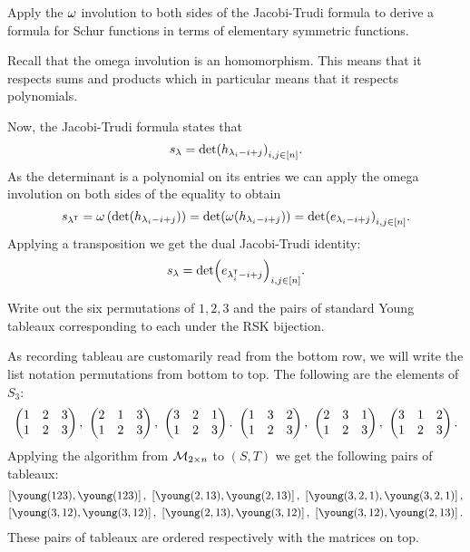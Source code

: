 \documentclass[12pt]{memoir}
\begin{document}
\begin{Ej}[Exercise 2]
    Apply the $\omega$ involution to both sides of the Jacobi-Trudi formula to derive a formula
for Schur functions in terms of elementary symmetric functions.
\end{Ej}

\begin{ptcbr}
    Recall that the omega involution is an homomorphism. This means that it respects sums and products which in particular means that it respects polynomials.\par 
    Now, the Jacobi-Trudi formula states that 
    $$s_\lambda=\det(h_{\lambda_i-i+j})_{i,j\in[n]}.$$
    As the determinant is a polynomial on its entries we can apply the omega involution on both sides of the equality to obtain 
    $$s_{\lambda^{\mathsf{T}}}=\omega\left(\det(h_{\lambda_i-i+j})\right)=\det(\omega(h_{\lambda_i-i+j}))=\det(e_{\lambda_i-i+j})_{i,j\in[n]}.$$
    Applying a transposition we get the dual Jacobi-Trudi identity:
    $$s_{\lambda}=\det(e_{\lambda^{\mathsf{T}}_i-i+j})_{i,j\in[n]}.$$
\end{ptcbr}

\begin{Ej}[Exercise 3]
    Write out the six permutations of $1, 2, 3$ and the pairs of standard Young tableaux corresponding to each under the RSK bijection.
\end{Ej}

\begin{ptcbr}
    As recording tableau are customarily read from the bottom row, we will write the list notation permutations from bottom to top. The following are the elements of $S_3$:
    \begin{gather*}
        \twobythree{1}{2}{3}{1}{2}{3},\ \twobythree{2}{1}{3}{1}{2}{3},\ \twobythree{3}{2}{1}{1}{2}{3}.\ \twobythree{1}{3}{2}{1}{2}{3},\ \twobythree{2}{3}{1}{1}{2}{3},\ \twobythree{3}{1}{2}{1}{2}{3}. 
    \end{gather*}
    Applying the algorithm from $\mathcal{M}_{2\times n}$ to $(S,T)$ we get the following pairs of tableaux:
    \begin{gather*}
        \left[\young(123),\young(123)\right],\ \left[\young(2,13),\young(2,13)\right],\ \left[\young(3,2,1),\young(3,2,1)\right],\\
        \left[\young(3,12),\young(3,12)\right],\ \left[\young(2,13),\young(3,12)\right],\ \left[\young(3,12),\young(2,13)\right].
    \end{gather*}
    These pairs of tableaux are ordered respectively with the matrices on top. 
\end{ptcbr}
\end{document}

